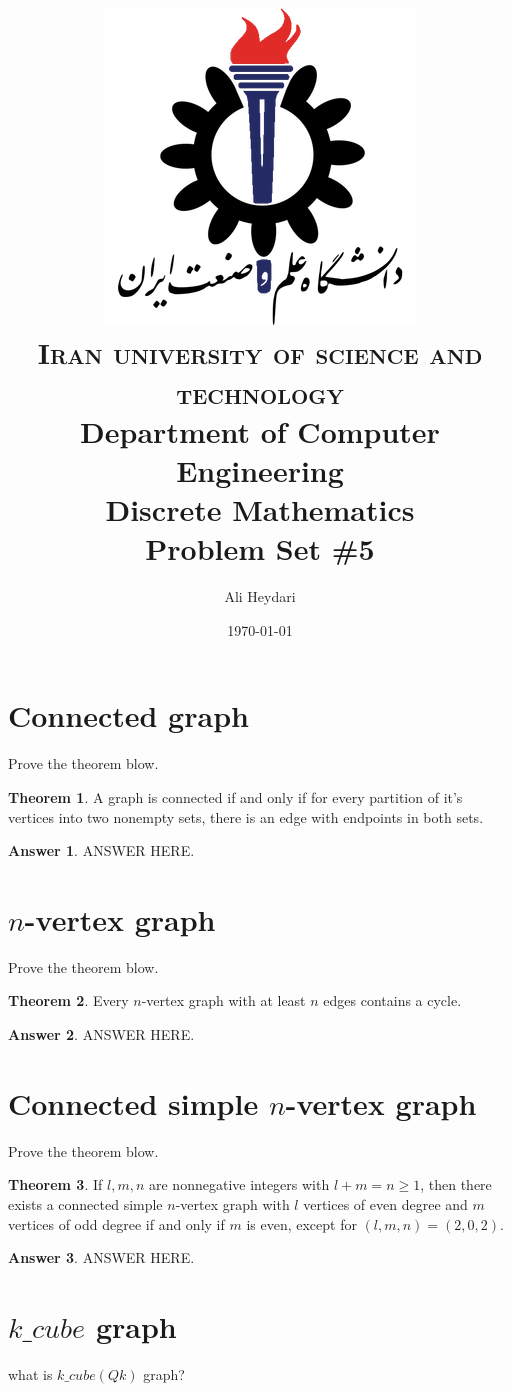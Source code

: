\documentclass[a4paper]{article}
\title{
\textsc{
\center
\includegraphics[scale=0.5]{IUST_logo_color} \\
Iran university of science and technology} \\ [25pt] %
Department of Computer Engineering \\
Discrete Mathematics\\Problem Set \#5 \\
}
\author{Ali Heydari}
\date{\today}
\renewcommand{\(}{\left(}
\renewcommand{\)}{\right)}
\theoremstyle{plain}
\theoremstyle{plain}
\theoremstyle{definition}
\newtheorem*{answer}{Answer}
\newtheorem{theorem}{Theorem}[section]
\begin{document}
\maketitle

\section{Connected graph}
Prove the theorem blow.
\begin{theorem}
A graph is connected if and only if for every partition of it's vertices into two nonempty sets, there
is an edge with endpoints in both sets.
\end{theorem}
\begin{shaded}
\begin{answer}
ANSWER HERE.
\end{answer}
\end{shaded}

\section{$n$-vertex graph}
Prove the theorem blow.
\begin{theorem}
Every $n$-vertex graph with at least $n$ edges contains a cycle.
\end{theorem}
\begin{shaded}
\begin{answer}
ANSWER HERE.
\end{answer}
\end{shaded}
\section{Connected simple $n$-vertex graph}
Prove the theorem blow.
\begin{theorem}
If $l, m, n$ are nonnegative integers with $l + m = n \geq 1$, then there exists a connected simple $n$-vertex
graph with $l$ vertices of even degree and $m$ vertices of odd degree if and only if $m$ is even,
except for $(l, m, n) = (2, 0, 2)$.
\end{theorem}
\begin{shaded}
\begin{answer}
ANSWER HERE.
\end{answer}
\end{shaded}



\section{$k\_cube$ graph}
what is $k\_cube(Qk)$ graph?
\end{document}
